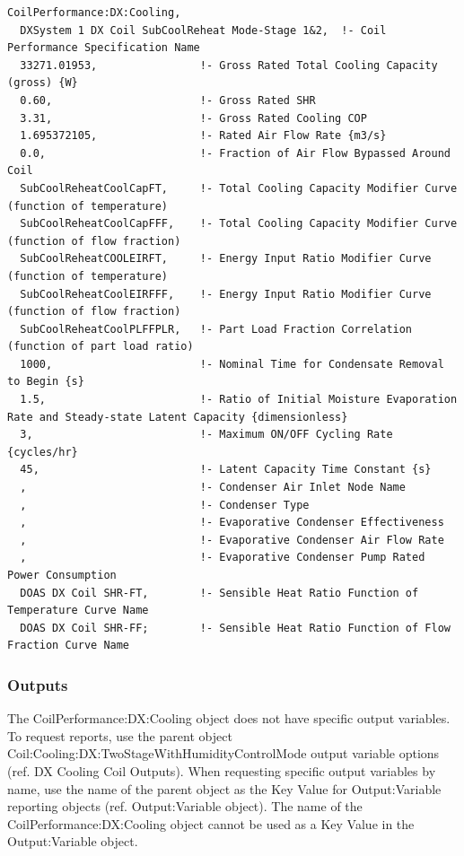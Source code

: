 \begin{lstlisting}
CoilPerformance:DX:Cooling,
  DXSystem 1 DX Coil SubCoolReheat Mode-Stage 1&2,  !- Coil Performance Specification Name
  33271.01953,                !- Gross Rated Total Cooling Capacity (gross) {W}
  0.60,                       !- Gross Rated SHR
  3.31,                       !- Gross Rated Cooling COP
  1.695372105,                !- Rated Air Flow Rate {m3/s}
  0.0,                        !- Fraction of Air Flow Bypassed Around Coil
  SubCoolReheatCoolCapFT,     !- Total Cooling Capacity Modifier Curve (function of temperature)
  SubCoolReheatCoolCapFFF,    !- Total Cooling Capacity Modifier Curve (function of flow fraction)
  SubCoolReheatCOOLEIRFT,     !- Energy Input Ratio Modifier Curve (function of temperature)
  SubCoolReheatCoolEIRFFF,    !- Energy Input Ratio Modifier Curve (function of flow fraction)
  SubCoolReheatCoolPLFFPLR,   !- Part Load Fraction Correlation (function of part load ratio)
  1000,                       !- Nominal Time for Condensate Removal to Begin {s}
  1.5,                        !- Ratio of Initial Moisture Evaporation Rate and Steady-state Latent Capacity {dimensionless}
  3,                          !- Maximum ON/OFF Cycling Rate {cycles/hr}
  45,                         !- Latent Capacity Time Constant {s}
  ,                           !- Condenser Air Inlet Node Name
  ,                           !- Condenser Type
  ,                           !- Evaporative Condenser Effectiveness
  ,                           !- Evaporative Condenser Air Flow Rate
  ,                           !- Evaporative Condenser Pump Rated Power Consumption
  DOAS DX Coil SHR-FT,        !- Sensible Heat Ratio Function of Temperature Curve Name
  DOAS DX Coil SHR-FF;        !- Sensible Heat Ratio Function of Flow Fraction Curve Name
\end{lstlisting}

\subsubsection{Outputs}\label{outputs-14-001}

The CoilPerformance:DX:Cooling object does not have specific output variables. To request reports, use the parent object Coil:Cooling:DX:TwoStageWithHumidityControlMode output variable options (ref. DX Cooling Coil Outputs). When requesting specific output variables by name, use the name of the parent object as the Key Value for Output:Variable reporting objects (ref. Output:Variable object). The name of the CoilPerformance:DX:Cooling object cannot be used as a Key Value in the Output:Variable object.

